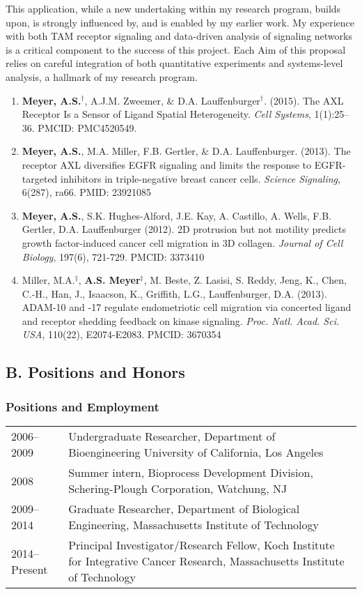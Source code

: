 \documentclass[11pt]{article}
\begin{document}
This application, while a new undertaking within my research program, builds upon, is strongly influenced by, and is enabled by my earlier work. My experience with both TAM receptor signaling and data-driven analysis of signaling networks is a critical component to the success of this project. Each Aim of this proposal relies on careful integration of both quantitative experiments and systems-level analysis, a hallmark of my research program.

\begin{enumerate}
  \item \textbf{Meyer, A.S.}$^\dag$, A.J.M. Zweemer, \& D.A. Lauffenburger$^\dag$. (2015). The AXL Receptor Is a Sensor of Ligand Spatial Heterogeneity. \emph{Cell Systems}, 1(1):25--36. PMCID: PMC4520549.
  \item \textbf{Meyer, A.S.}, M.A. Miller, F.B. Gertler, \& D.A. Lauffenburger. (2013). The receptor AXL diversifies EGFR signaling and limits the response to EGFR-targeted inhibitors in triple-negative breast cancer cells. \emph{Science Signaling}, 6(287), ra66. PMID: 23921085
  \item \textbf{Meyer, A.S.}, S.K. Hughes-Alford, J.E. Kay, A. Castillo, A. Wells, F.B. Gertler, D.A. Lauffenburger (2012). 2D protrusion but not motility predicts growth factor-induced cancer cell migration in 3D collagen. \emph{Journal of Cell Biology}, 197(6), 721-729. PMCID: 3373410
  \item Miller, M.A.$^\ddag$, \textbf{A.S. Meyer}$^\ddag$, M. Beste, Z. Lasisi, S. Reddy, Jeng, K., Chen, C.-H., Han, J., Isaacson, K., Griffith, L.G., Lauffenburger, D.A. (2013). ADAM-10 and -17 regulate endometriotic cell migration via concerted ligand and receptor shedding feedback on kinase signaling. \emph{Proc. Natl. Acad. Sci. USA}, 110(22), E2074-E2083. PMCID: 3670354
\end{enumerate}





\subsection{B. Positions and Honors}

\subsubsection{Positions and Employment}

\begin{tabular}{p{1.1in}p{6.1in}}
  2006--2009 & Undergraduate Researcher, Department of Bioengineering
		University of California, Los Angeles\\
  2008 & Summer intern, Bioprocess Development Division, Schering-Plough Corporation, Watchung, NJ \\
  2009--2014 & Graduate Researcher, Department of Biological Engineering, Massachusetts Institute of Technology \\
  2014--Present & Principal Investigator/Research Fellow, Koch Institute for Integrative Cancer Research, Massachusetts Institute of Technology
\end{tabular}
\end{document}

